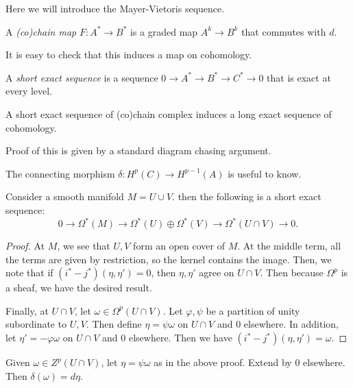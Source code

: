 \documentclass[twoside, 10pt]{article}
\begin{document}
    Here we will introduce the Mayer-Vietoris sequence.

    \begin{defn}
        A \textit{(co)chain map} $F:A^* \to B^*$ is a graded map $A^k \to B^k$ that commutes with $d$.
    \end{defn}

    It is easy to check that this induces a map on cohomology.

    \begin{defn}
        A \textit{short exact sequence} is a sequence $0 \to A^* \to B^* \to C^* \to 0$ that is exact at every level.
    \end{defn}

    \begin{lem}
        A short exact sequence of (co)chain complex induces a long exact sequence of cohomology.
    \end{lem}

    Proof of this is given by a standard diagram chasing argument.

    \begin{rmk}
        The connecting morphism $\delta: H^p(C) \to H^{p-1}(A)$ is useful to know.
    \end{rmk}

    \begin{thm}
        Consider a smooth manifold $M = U \cup V$. then the following is a short exact sequence:
        \[ 0 \to \Omega^*(M) \to \Omega^*(U) \oplus \Omega^*(V) \to \Omega^*(U \cap V) \to 0.\]
    \end{thm}

    \begin{proof}
        At $M$, we see that $U,V$ form an open cover of $M$. At the middle term, all the terms are given by restriction, so the kernel contains the image. Then, we note that if $(i^* - j^*)(\eta, \eta') = 0$, then $\eta, \eta'$ agree on $U \cap V$. Then because $\Omega^p$ is a sheaf, we have the desired result.

        Finally, at $U \cap V$, let $\omega \in \Omega^p(U \cap V)$. Let $\varphi, \psi$ be a partition of unity subordinate to $U,V$. Then define $\eta = \psi \omega$ on $U \cap V$ and $0$ elsewhere. In addition, let $\eta' = -\varphi\omega$ on $U \cap V$ and $0$ elsewhere. Then we have $(i^*-j^*)(\eta, \eta') = \omega$.
    \end{proof}

    \begin{cor}
        Given $\omega \in Z^p(U \cap V)$, let $\eta = \psi\omega$ as in the above proof. Extend by $0$ elsewhere. Then $\delta(\omega) = d\eta$.
    \end{cor}
\end{document}
